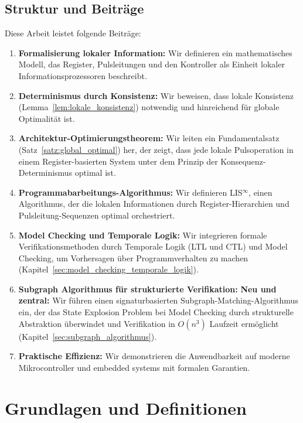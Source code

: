 \documentclass[a4paper,12pt]{article}
\theoremstyle{definition}
\begin{document}
\subsection{Struktur und Beiträge}

Diese Arbeit leistet folgende Beiträge:

\begin{enumerate}
	\item \textbf{Formalisierung lokaler Information:} Wir definieren ein mathematisches Modell, das Register, Pulsleitungen und den Kontroller als Einheit lokaler Informationsprozessoren beschreibt.
	
	\item \textbf{Determinismus durch Konsistenz:} Wir beweisen, dass lokale Konsistenz (Lemma~\ref{lem:lokale_konsistenz}) notwendig und hinreichend für globale Optimalität ist.
	
	\item \textbf{Architektur-Optimierungstheorem:} Wir leiten ein Fundamentalsatz (Satz~\ref{satz:global_optimal}) her, der zeigt, dass jede lokale Pulsoperation in einem Register-basierten System unter dem Prinzip der Konsequenz-Determinismus optimal ist.
	
	\item \textbf{Programmabarbeitungs-Algorithmus:} Wir definieren LIS$^{\infty}$, einen Algorithmus, der die lokalen Informationen durch Register-Hierarchien und Pulsleitung-Sequenzen optimal orchestriert.
	
	\item \textbf{Model Checking und Temporale Logik:} Wir integrieren formale Verifikationsmethoden durch Temporale Logik (LTL und CTL) und Model Checking, um Vorhersagen über Programmverhalten zu machen (Kapitel~\ref{sec:model_checking_temporale_logik}).
	
	\item \textbf{Subgraph Algorithmus für strukturierte Verifikation:} \textbf{Neu und zentral:} Wir führen einen signaturbasierten Subgraph-Matching-Algorithmus ein, der das State Explosion Problem bei Model Checking durch strukturelle Abstraktion überwindet und Verifikation in $O(n^3)$ Laufzeit ermöglicht (Kapitel~\ref{sec:subgraph_algorithmus}).
	
	\item \textbf{Praktische Effizienz:} Wir demonstrieren die Anwendbarkeit auf moderne Mikrocontroller und embedded systems mit formalen Garantien.
\end{enumerate}

\section{Grundlagen und Definitionen}
\label{sec:grundlagen}
\end{document}
